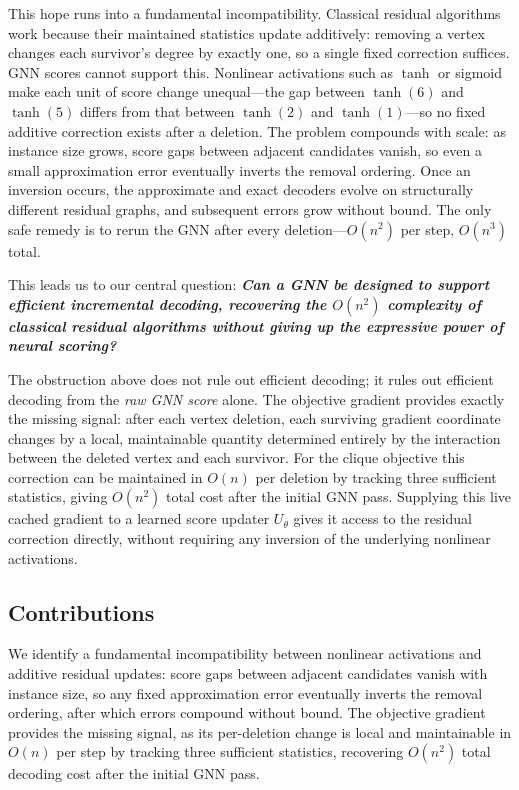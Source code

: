 \documentclass[journal,article,submit,pdftex,moreauthors]{Definitions/mdpi}
\begin{document}
This hope runs into a fundamental incompatibility. Classical residual algorithms work
because their maintained statistics update additively: removing a vertex changes each
survivor's degree by exactly one, so a single fixed correction suffices. GNN scores
cannot support this. Nonlinear activations such as $\tanh$ or sigmoid make each unit
of score change unequal---the gap between $\tanh(6)$ and $\tanh(5)$ differs from
that between $\tanh(2)$ and $\tanh(1)$---so no fixed additive correction exists
after a deletion. The problem compounds with scale: as instance size grows, score
gaps between adjacent candidates vanish, so even a small approximation error
eventually inverts the removal ordering. Once an inversion occurs, the approximate
and exact decoders evolve on structurally different residual graphs, and subsequent
errors grow without bound. The only safe remedy is to rerun the GNN after every
deletion---$O(n^2)$ per step, $O(n^3)$ total.

This leads us to our central question: \textbf{\emph{Can a GNN be designed to
    support efficient incremental decoding, recovering the $O(n^2)$ complexity of
    classical residual algorithms without giving up the expressive power of neural
scoring?}}


The obstruction above does not rule out efficient decoding; it rules out efficient
decoding from the \emph{raw GNN score} alone. The objective gradient provides
exactly the missing signal: after each vertex deletion, each surviving gradient
coordinate changes by a local, maintainable quantity determined entirely by the
interaction between the deleted vertex and each survivor. For the clique objective
this correction can be maintained in $O(n)$ per deletion by tracking three
sufficient statistics, giving $O(n^2)$ total cost after the initial GNN pass.
Supplying this live cached gradient to a learned score updater $U_\theta$ gives it
access to the residual correction directly, without requiring any inversion of the
underlying nonlinear activations.

\subsection{Contributions}

We identify a fundamental incompatibility between nonlinear activations and additive
residual updates: score gaps between adjacent candidates vanish with instance size,
so any fixed approximation error eventually inverts the removal ordering, after which
errors compound without bound. The objective gradient provides the missing signal,
as its per-deletion change is local and maintainable in $O(n)$ per step by tracking
three sufficient statistics, recovering $O(n^2)$ total decoding cost after the
initial GNN pass.
\end{document}
